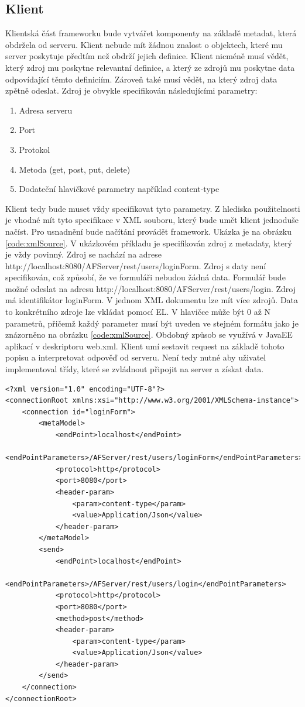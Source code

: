 \subsection{Klient}
Klientská část frameworku bude vytvářet komponenty na základě metadat, která obdržela od serveru. Klient nebude mít žádnou znalost o objektech, které mu server poskytuje předtím než obdrží jejich definice. Klient nicméně musí vědět, který zdroj mu poskytne relevantní definice, a který ze zdrojů mu poskytne data odpovídající těmto definiciím. Zároveň také musí vědět, na který zdroj data zpětně odeslat. Zdroj je obvykle specifikován následujícími parametry:
\begin{enumerate}
\item Adresa serveru
\item Port
\item Protokol
\item Metoda (get, post, put, delete)
\item Dodateční hlavičkové parametry například content-type
\end{enumerate}
Klient tedy bude muset vždy specifikovat tyto parametry. Z hlediska použitelnosti je vhodné mít tyto specifikace v XML souboru, který bude umět klient jednoduše načíst. Pro usnadnění bude načítání provádět framework.  Ukázka je na obrázku \ref{code:xmlSource}. V ukázkovém příkladu je specifikován zdroj z metadaty, který je vždy povinný. Zdroj se nachází na adrese\\ http://localhost:8080/AFServer/rest/users/loginForm. Zdroj s daty není specifikován, což způsobí, že ve formuláři nebudou žádná data. Formulář bude možné odeslat na adresu http://localhost:8080/AFServer/rest/users/login. Zdroj má identifikátor loginForm. V jednom XML dokumentu lze mít více zdrojů. Data to konkrétního zdroje lze vkládat pomocí EL. V hlavičce může být 0 až N parametrů, přičemž každý parameter musí být uveden ve stejném formátu jako je znázorněno na obrázku \ref{code:xmlSource}. Obdobný způsob se využívá v JavaEE aplikací v deskriptoru web.xml. Klient umí sestavit request na základě tohoto popisu a interpretovat odpověď od serveru. Není tedy nutné aby uživatel implementoval třídy, které se zvládnout připojit na server a získat data.

\begin{lstlisting}[caption=Ukázka XML specifikace zdrojů,
  label=code:xmlSource]
<?xml version="1.0" encoding="UTF-8"?>
<connectionRoot xmlns:xsi="http://www.w3.org/2001/XMLSchema-instance">
	<connection id="loginForm">
		<metaModel>
			<endPoint>localhost</endPoint>
			<endPointParameters>/AFServer/rest/users/loginForm</endPointParameters>
			<protocol>http</protocol>
			<port>8080</port>
			<header-param>
				<param>content-type</param>
				<value>Application/Json</value>
			</header-param>
		</metaModel>
		<send>
			<endPoint>localhost</endPoint>
			<endPointParameters>/AFServer/rest/users/login</endPointParameters>
			<protocol>http</protocol>
			<port>8080</port>
			<method>post</method>
			<header-param>
				<param>content-type</param>
				<value>Application/Json</value>
			</header-param>
		</send>
	</connection>
</connectionRoot>
\end{lstlisting}

